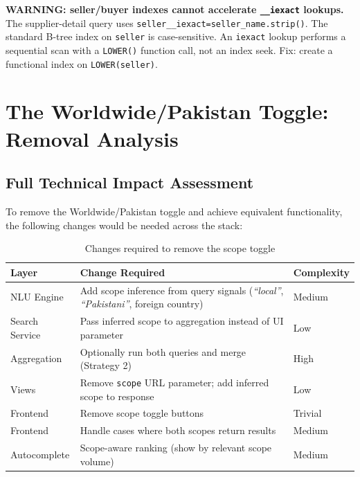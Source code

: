 \documentclass[12pt,a4paper]{article}
\begin{document}
\begin{warnBox}
\textbf{WARNING: seller/buyer indexes cannot accelerate \texttt{\_\_iexact} lookups.}
The supplier-detail query uses \texttt{seller\_\_iexact=seller\_name.strip()}.
The standard B-tree index on \texttt{seller} is case-sensitive. An \texttt{iexact} lookup
performs a sequential scan with a \texttt{LOWER()} function call, not an index seek.
Fix: create a functional index on \texttt{LOWER(seller)}.
\end{warnBox}

\section{The Worldwide/Pakistan Toggle: Removal Analysis}

\subsection{Full Technical Impact Assessment}

To remove the Worldwide/Pakistan toggle and achieve equivalent functionality, the following
changes would be needed across the stack:

\begin{table}[H]
\centering
\renewcommand{\arraystretch}{1.3}
\begin{tabularx}{\textwidth}{lXl}
\toprule
\textbf{Layer} & \textbf{Change Required} & \textbf{Complexity} \\
\midrule
NLU Engine & Add scope inference from query signals (\textit{``local''}, \textit{``Pakistani''}, foreign country) & Medium \\
Search Service & Pass inferred scope to aggregation instead of UI parameter & Low \\
Aggregation & Optionally run both queries and merge (Strategy 2) & High \\
Views & Remove \texttt{scope} URL parameter; add inferred scope to response & Low \\
Frontend & Remove scope toggle buttons & Trivial \\
Frontend & Handle cases where both scopes return results & Medium \\
Autocomplete & Scope-aware ranking (show by relevant scope volume) & Medium \\
\bottomrule
\end{tabularx}
\caption{Changes required to remove the scope toggle}
\end{table}
\end{document}
